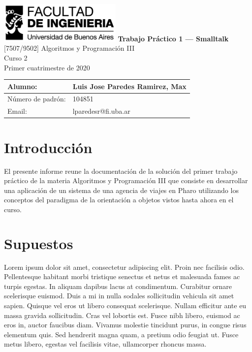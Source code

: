 \documentclass[titlepage,a4paper]{article}
\begin{document}
\begin{titlepage} %
	\hfill\includegraphics[width=6cm]{logofiuba.jpg}
    \centering
    \vfill
    \Huge \textbf{Trabajo Práctico 1 — Smalltalk}
    \vskip2cm
    \Large [7507/9502] Algoritmos y Programación III\\
    Curso 2 \\ %
    Primer cuatrimestre de 2020 
    \vfill
    \begin{tabular}{ | l | l | } %
      \hline
      Alumno: & Luis Jose Paredes Ramirez, Max \\ \hline
      Número de padrón: & 104851 \\ \hline
      Email: & lparedesr@fi.uba.ar \\ \hline
  	\end{tabular}
    \vfill
    \vfill
\end{titlepage}

\tableofcontents %
\newpage

\section{Introducción}\label{sec:intro}
El presente informe reune la documentación de la solución del primer trabajo práctico de la materia Algoritmos y Programación III que consiste en desarrollar una aplicación de un sistema de una agencia de viajes en Pharo utilizando los conceptos del paradigma de la orientación a objetos vistos hasta ahora en el curso.

\section{Supuestos}\label{sec:supuestos}

Lorem ipsum dolor sit amet, consectetur adipiscing elit. Proin nec facilisis odio. Pellentesque habitant morbi tristique senectus et netus et malesuada fames ac turpis egestas. In aliquam dapibus lacus at condimentum. Curabitur ornare scelerisque euismod. Duis a mi in nulla sodales sollicitudin vehicula sit amet sapien. Quisque vel eros ut libero consequat scelerisque. Nullam efficitur ante eu massa gravida sollicitudin. Cras vel lobortis est. Fusce nibh libero, euismod ac eros in, auctor faucibus diam. Vivamus molestie tincidunt purus, in congue risus elementum quis. Sed hendrerit magna quam, a pretium odio feugiat ut. Fusce metus libero, egestas vel facilisis vitae, ullamcorper rhoncus massa.
\end{document}
